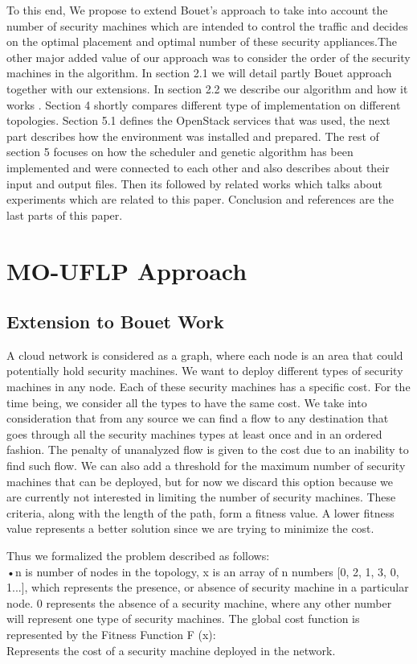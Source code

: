 \documentclass{article}
\begin{document}
To this end, We propose to extend Bouet's approach to take into account the number of security machines which are intended to control the traffic and decides on the optimal placement and optimal number of these security appliances.The other major added value  of our approach was to consider the order of the security machines in the algorithm. In section 2.1 we will detail partly Bouet approach together with our extensions. In section 2.2 we describe our algorithm and how it works . Section 4 shortly compares different type of implementation on different topologies. Section 5.1 defines the OpenStack services that was used, the next part describes how the environment was installed and prepared. The rest of section 5 focuses on how the scheduler and genetic algorithm has been implemented and were connected to each other and also describes about their input and output files. Then its followed by related works which talks about experiments which are related to this paper. Conclusion and references are the last parts of this paper.


\section{MO-UFLP Approach}
\subsection{Extension to Bouet Work}

 A cloud network is considered as a graph, where each node is an area that could potentially hold security machines. We want to deploy different types of security machines in any node. Each of these security machines has a specific cost. For the time being, we consider all the types to have the same cost. We  take into consideration that from any source we can find a flow to any destination that goes through all the security machines types at least once and in an ordered fashion. The penalty of unanalyzed flow is given to the cost due to an inability to find such flow.
 We can also add a threshold for the maximum number of security machines that can be deployed, but for now we discard this option because we are currently not interested in limiting the number of security machines. These criteria, along with the length of the path, form a fitness value. A lower fitness value represents a better solution since we are trying to minimize the cost.\\ \newline

 Thus we formalized the problem  described as follows:\\
 •n is number of nodes in the topology, x is an array of n numbers [0, 2, 1, 3, 0, 1...], which represents the presence, or absence of security machine in a particular node. 0 represents the absence of a security machine, where any other number will represent one type of security machines. The global cost function is represented by the Fitness Function F (x):\\ \newline
 Represents the cost of a security machine deployed in the network.\\
 \\ \newline
 
\end{document}
